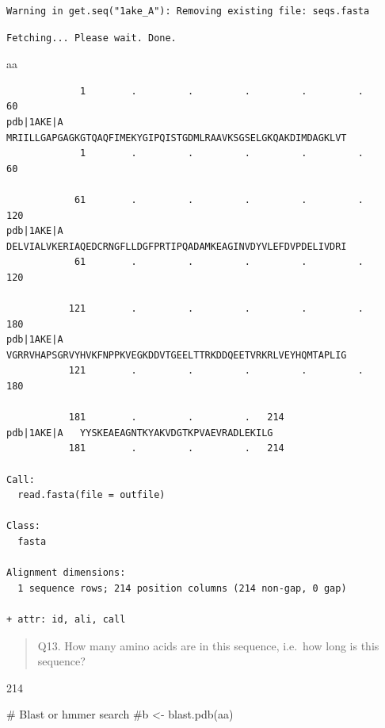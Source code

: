 \documentclass[
  letterpaper,
  DIV=11,
  numbers=noendperiod]{scrartcl}
\newenvironment{Shaded}{\begin{snugshade}}{\end{snugshade}}
\newcommand{\CommentTok}[1]{\textcolor[rgb]{0.37,0.37,0.37}{#1}}
\newcommand{\NormalTok}[1]{\textcolor[rgb]{0.00,0.23,0.31}{#1}}
\begin{document}
\begin{verbatim}
Warning in get.seq("1ake_A"): Removing existing file: seqs.fasta
\end{verbatim}

\begin{verbatim}
Fetching... Please wait. Done.
\end{verbatim}

\begin{Shaded}
\begin{Highlighting}[]
\NormalTok{aa}
\end{Highlighting}
\end{Shaded}

\begin{verbatim}
             1        .         .         .         .         .         60 
pdb|1AKE|A   MRIILLGAPGAGKGTQAQFIMEKYGIPQISTGDMLRAAVKSGSELGKQAKDIMDAGKLVT
             1        .         .         .         .         .         60 

            61        .         .         .         .         .         120 
pdb|1AKE|A   DELVIALVKERIAQEDCRNGFLLDGFPRTIPQADAMKEAGINVDYVLEFDVPDELIVDRI
            61        .         .         .         .         .         120 

           121        .         .         .         .         .         180 
pdb|1AKE|A   VGRRVHAPSGRVYHVKFNPPKVEGKDDVTGEELTTRKDDQEETVRKRLVEYHQMTAPLIG
           121        .         .         .         .         .         180 

           181        .         .         .   214 
pdb|1AKE|A   YYSKEAEAGNTKYAKVDGTKPVAEVRADLEKILG
           181        .         .         .   214 

Call:
  read.fasta(file = outfile)

Class:
  fasta

Alignment dimensions:
  1 sequence rows; 214 position columns (214 non-gap, 0 gap) 

+ attr: id, ali, call
\end{verbatim}

\begin{quote}
Q13. How many amino acids are in this sequence, i.e.~how long is this
sequence?
\end{quote}

214

\begin{Shaded}
\begin{Highlighting}[]
\CommentTok{\# Blast or hmmer search }
\CommentTok{\#b \textless{}{-} blast.pdb(aa)}
\end{Highlighting}
\end{Shaded}
\end{document}
